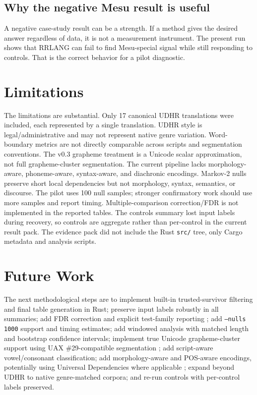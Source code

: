 \documentclass[11pt,a4paper]{article}
\newcommand{\RRLANG}{\textsc{RRLANG}}
\begin{document}
\subsection{Why the negative Mesu result is useful}
A negative case-study result can be a strength. If a method gives the desired answer regardless of data, it is not a measurement instrument. The present run shows that \RRLANG{} can fail to find Mesu-special signal while still responding to controls. That is the correct behavior for a pilot diagnostic.


\section{Limitations}
The limitations are substantial. Only 17 canonical UDHR translations were included, each represented by a single translation. UDHR style is legal/administrative and may not represent native genre variation. Word-boundary metrics are not directly comparable across scripts and segmentation conventions. The v0.3 grapheme treatment is a Unicode scalar approximation, not full grapheme-cluster segmentation. The current pipeline lacks morphology-aware, phoneme-aware, syntax-aware, and diachronic encodings. Markov-2 nulls preserve short local dependencies but not morphology, syntax, semantics, or discourse. The pilot uses 100 null samples; stronger confirmatory work should use more samples and report timing. Multiple-comparison correction/FDR is not implemented in the reported tables. The controls summary lost input labels during recovery, so controls are aggregate rather than per-control in the current result pack. The evidence pack did not include the Rust \texttt{src/} tree, only Cargo metadata and analysis scripts.


\section{Future Work}
The next methodological steps are to implement built-in trusted-survivor filtering and final table generation in Rust; preserve input labels robustly in all summaries; add FDR correction and explicit test-family reporting \cite{benjamini1995}; add \texttt{--nulls 1000} support and timing estimates; add windowed analysis with matched length and bootstrap confidence intervals; implement true Unicode grapheme-cluster support using UAX \#29-compatible segmentation \cite{unicode29}; add script-aware vowel/consonant classification; add morphology-aware and POS-aware encodings, potentially using Universal Dependencies where applicable \cite{ud}; expand beyond UDHR to native genre-matched corpora; and re-run controls with per-control labels preserved.
\end{document}
